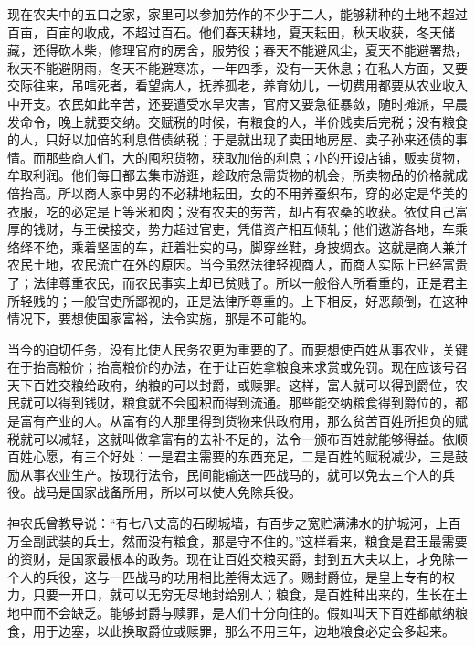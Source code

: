 \documentclass[12pt,UTF-8,openany,a4]{ctexbook}
\begin{document}
\begin{large}
    现在农夫中的五口之家，家里可以参加劳作的不少于二人，能够耕种的土地不超过百亩，百亩的收成，不超过百石。他们春天耕地，夏天耘田，秋天收获，冬天储藏，还得砍木柴，修理官府的房舍，服劳役；春天不能避风尘，夏天不能避署热，秋天不能避阴雨，冬天不能避寒冻，一年四季，没有一天休息；在私人方面，又要交际往来，吊唁死者，看望病人，抚养孤老，养育幼儿，一切费用都要从农业收入中开支。农民如此辛苦，还要遭受水旱灾害，官府又要急征暴敛，随时摊派，早晨发命令，晚上就要交纳。交赋税的时候，有粮食的人，半价贱卖后完税；没有粮食的人，只好以加倍的利息借债纳税；于是就出现了卖田地房屋、卖子孙来还债的事情。而那些商人们，大的囤积货物，获取加倍的利息；小的开设店铺，贩卖货物，牟取利润。他们每日都去集市游逛，趁政府急需货物的机会，所卖物品的价格就成倍抬高。所以商人家中男的不必耕地耘田，女的不用养蚕织布，穿的必定是华美的衣服，吃的必定是上等米和肉；没有农夫的劳苦，却占有农桑的收获。依仗自己富厚的钱财，与王侯接交，势力超过官吏，凭借资产相互倾轧；他们遨游各地，车乘络绎不绝，乘着坚固的车，赶着壮实的马，脚穿丝鞋，身披绸衣。这就是商人兼并农民土地，农民流亡在外的原因。当今虽然法律轻视商人，而商人实际上已经富贵了；法律尊重农民，而农民事实上却已贫贱了。所以一般俗人所看重的，正是君主所轻贱的；一般官吏所鄙视的，正是法律所尊重的。上下相反，好恶颠倒，在这种情况下，要想使国家富裕，法令实施，那是不可能的。
    
    当今的迫切任务，没有比使人民务农更为重要的了。而要想使百姓从事农业，关键在于抬高粮价；抬高粮价的办法，在于让百姓拿粮食来求赏或免罚。现在应该号召天下百姓交粮给政府，纳粮的可以封爵，或赎罪。这样，富人就可以得到爵位，农民就可以得到钱财，粮食就不会囤积而得到流通。那些能交纳粮食得到爵位的，都是富有产业的人。从富有的人那里得到货物来供政府用，那么贫苦百姓所担负的赋税就可以减轻，这就叫做拿富有的去补不足的，法令一颁布百姓就能够得益。依顺百姓心愿，有三个好处：一是君主需要的东西充足，二是百姓的赋税减少，三是鼓励从事农业生产。按现行法令，民间能输送一匹战马的，就可以免去三个人的兵役。战马是国家战备所用，所以可以使人免除兵役。
    
    神农氏曾教导说：“有七八丈高的石砌城墙，有百步之宽贮满沸水的护城河，上百万全副武装的兵士，然而没有粮食，那是守不住的。”这样看来，粮食是君王最需要的资财，是国家最根本的政务。现在让百姓交粮买爵，封到五大夫以上，才免除一个人的兵役，这与一匹战马的功用相比差得太远了。赐封爵位，是皇上专有的权力，只要一开口，就可以无穷无尽地封给别人；粮食，是百姓种出来的，生长在土地中而不会缺乏。能够封爵与赎罪，是人们十分向往的。假如叫天下百姓都献纳粮食，用于边塞，以此换取爵位或赎罪，那么不用三年，边地粮食必定会多起来。
    
\end{large}
\end{document}
